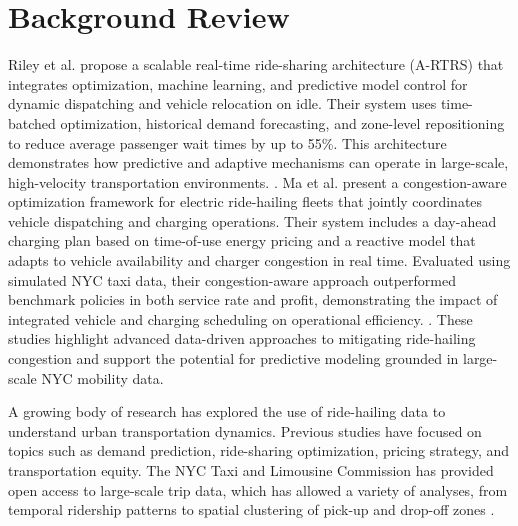 \documentclass[12pt,letterpaper]{article}
\begin{document}
\section{Background Review}
Riley et al. propose a scalable real-time ride-sharing architecture (A-RTRS) that integrates optimization, machine learning, and predictive model control for dynamic dispatching and vehicle relocation on idle. Their system uses time-batched optimization, historical demand forecasting, and zone-level repositioning to reduce average passenger wait times by up to 55\%. This architecture demonstrates how predictive and adaptive mechanisms can operate in large-scale, high-velocity transportation environments. \cite{riley2020dispatching}. Ma et al. present a congestion-aware optimization framework for electric ride-hailing fleets that jointly coordinates vehicle dispatching and charging operations. Their system includes a day-ahead charging plan based on time-of-use energy pricing and a reactive model that adapts to vehicle availability and charger congestion in real time. Evaluated using simulated NYC taxi data, their congestion-aware approach outperformed benchmark policies in both service rate and profit, demonstrating the impact of integrated vehicle and charging scheduling on operational efficiency. \cite{ma2024congestionaware}. These studies highlight advanced data-driven approaches to mitigating ride-hailing congestion and support the potential for predictive modeling grounded in large-scale NYC mobility data.

A growing body of research has explored the use of ride-hailing data to understand urban transportation dynamics. Previous studies have focused on topics such as demand prediction, ride-sharing optimization, pricing strategy, and transportation equity. The NYC Taxi and Limousine Commission has provided open access to large-scale trip data, which has allowed a variety of analyses, from temporal ridership patterns to spatial clustering of pick-up and drop-off zones \cite{nyctlc2023}.
\end{document}
